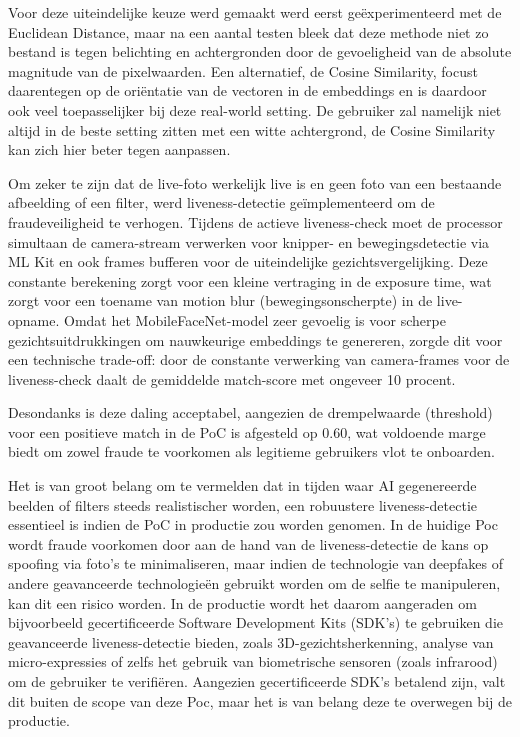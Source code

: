 \begin{itemize}
Voor deze uiteindelijke keuze werd gemaakt werd eerst geëxperimenteerd met de Euclidean Distance,
maar na een aantal testen bleek dat deze methode niet zo bestand is tegen belichting en achtergronden door de gevoeligheid van de absolute magnitude van de pixelwaarden.
Een alternatief, de Cosine Similarity, focust daarentegen op de oriëntatie van de vectoren in de embeddings en is daardoor ook veel toepasselijker bij deze real-world setting. 
De gebruiker zal namelijk niet altijd in de beste setting zitten met een witte achtergrond, de Cosine Similarity kan zich hier beter tegen aanpassen.

Om zeker te zijn dat de live-foto werkelijk live is en geen foto van een bestaande afbeelding of een filter, werd liveness-detectie geïmplementeerd om de fraudeveiligheid te verhogen.
Tijdens de actieve liveness-check moet de processor simultaan de camera-stream verwerken voor knipper- en bewegingsdetectie via ML Kit en ook
frames bufferen voor de uiteindelijke gezichtsvergelijking. Deze constante berekening zorgt voor een kleine vertraging in de exposure time, 
wat zorgt voor een toename van motion blur (bewegingsonscherpte) in de live-opname. 
Omdat het MobileFaceNet-model zeer gevoelig is voor scherpe gezichtsuitdrukkingen om nauwkeurige embeddings te genereren, 
zorgde dit voor een technische trade-off: door de constante verwerking van camera-frames voor de liveness-check daalt de gemiddelde match-score met ongeveer 10 procent.

Desondanks is deze daling acceptabel, aangezien de drempelwaarde (threshold) voor een positieve match in de PoC is afgesteld op 0.60, wat voldoende marge biedt om zowel fraude te voorkomen als legitieme gebruikers vlot te onboarden.

Het is van groot belang om te vermelden dat in tijden waar AI gegenereerde beelden of filters steeds realistischer worden, een robuustere liveness-detectie essentieel is indien de PoC in productie zou worden genomen.
In de huidige Poc wordt fraude voorkomen door aan de hand van de liveness-detectie de kans op spoofing via foto's te minimaliseren, maar indien de technologie van deepfakes of andere geavanceerde technologieën gebruikt worden
om de selfie te manipuleren, kan dit een risico worden. In de productie wordt het daarom aangeraden om bijvoorbeeld gecertificeerde Software Development Kits (SDK's) te gebruiken die geavanceerde liveness-detectie bieden, 
zoals 3D-gezichtsherkenning, analyse van micro-expressies of zelfs het gebruik van biometrische sensoren (zoals infrarood) om de gebruiker te verifiëren.
Aangezien gecertificeerde SDK's betalend zijn, valt dit buiten de scope van deze Poc, maar het is van belang deze te overwegen bij de productie.


\end{itemize}
